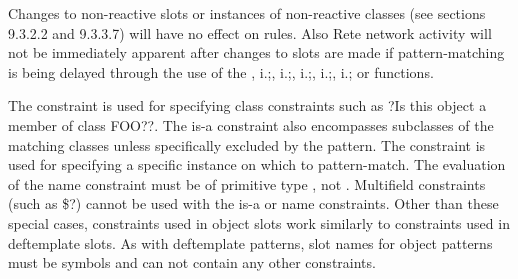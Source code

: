 \documentclass[letterpaper,10pt,english]{sphinxmanual}
\begin{document}
Changes to non-reactive slots or instances of non-reactive classes (see
sections 9.3.2.2 and 9.3.3.7) will have no effect on rules. Also Rete
network activity will not be immediately apparent after changes to slots
are made if pattern-matching is being delayed through the use of the
, i.;,
i.;, i.;,
i.;, i.; or
 functions.


\begin{sphinxVerbatim}[commandchars=\\\{\}]
   
    
  
 
\end{sphinxVerbatim}

The  constraint is used for specifying class constraints such as
?Is this object a member of class FOO??. The is-a constraint also
encompasses subclasses of the matching classes unless specifically
excluded by the pattern. The  constraint is used for specifying
a specific instance on which to pattern-match. The evaluation of the
name constraint must be of primitive type , not
. Multifield constraints (such as \$?) cannot be used with the
is-a or name constraints. Other than these special cases, constraints
used in object slots work similarly to constraints used in deftemplate
slots. As with deftemplate patterns, slot names for object patterns must
be symbols and can not contain any other constraints.
\end{document}
